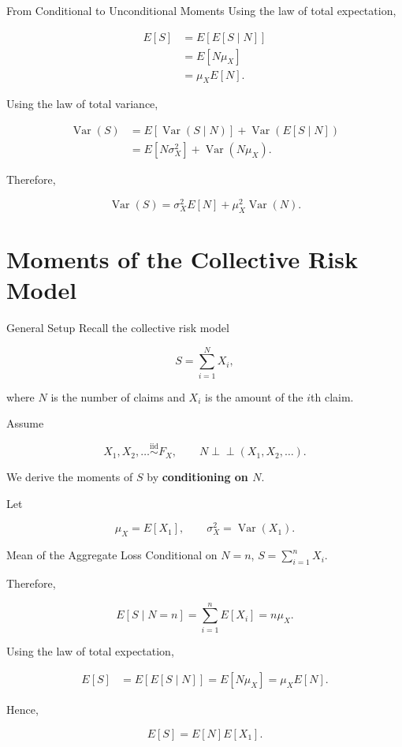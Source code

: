 \documentclass[
  ignorenonframetext,
  aspectratio=169,
]{beamer}
\begin{document}
\begin{frame}{From Conditional to Unconditional Moments}
\protect{}\label{from-conditional-to-unconditional-moments}
Using the law of total expectation,

\[
\begin{aligned}
E[S]
&=E[E[S\mid N]]\\
&=E[N\mu_X]\\
&=\mu_XE[N].
\end{aligned}
\]

Using the law of total variance,

\[
\begin{aligned}
\operatorname{Var}(S)
&=E[\operatorname{Var}(S\mid N)]
+\operatorname{Var}(E[S\mid N])\\
&=E[N\sigma_X^2]
+\operatorname{Var}(N\mu_X).
\end{aligned}
\]

Therefore,

\[
\boxed{
\operatorname{Var}(S)
=
\sigma_X^2E[N]
+\mu_X^2\operatorname{Var}(N)
}.
\]
\end{frame}

\section{Moments of the Collective Risk
Model}\label{moments-collective-risk-model}

\begin{frame}{General Setup}
\protect{}\label{general-setup}
Recall the collective risk model

\[
S=\sum_{i=1}^{N}X_i,
\]

where \(N\) is the number of claims and \(X_i\) is the amount of the
\(i\)th claim.

Assume

\[
X_1,X_2,\ldots \overset{\mathrm{iid}}{\sim} F_X,
\qquad
N\perp\!\!\!\perp (X_1,X_2,\ldots).
\]

We derive the moments of \(S\) by \textbf{conditioning on \(N\)}.

Let

\[
\mu_X=E[X_1],
\qquad
\sigma_X^2=\operatorname{Var}(X_1).
\]
\end{frame}

\begin{frame}{Mean of the Aggregate Loss}
\protect{}\label{mean-of-the-aggregate-loss}
Conditional on \(N=n\), \(S=\sum_{i=1}^{n}X_i.\)

Therefore,

\[
E[S\mid N=n]
=
\sum_{i=1}^{n}E[X_i]
=
n\mu_X.
\]

Using the law of total expectation,

\[
\begin{aligned}
E[S]
&=E[E[S\mid N]]=E[N\mu_X]=\mu_XE[N].
\end{aligned}
\]

Hence,

\[
\boxed{
E[S]=E[N]E[X_1]
}.
\]
\end{frame}
\end{document}
